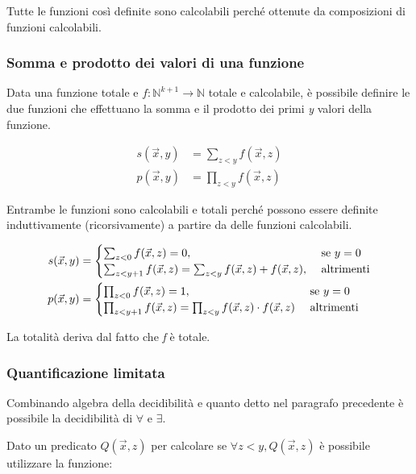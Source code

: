 Tutte le funzioni così definite sono calcolabili perché ottenute da composizioni di funzioni calcolabili.

\subsubsection{Somma e prodotto dei valori di una funzione}

Data una funzione totale e $ f : \mathbb{N}^{k+1} \rightarrow  \mathbb{N}$ totale e calcolabile, è possibile definire le due funzioni che effettuano la somma e il prodotto dei primi \textit{y} valori della funzione.

\begin{align*}
	s(\vec{x}, y) &= \sum_{z < y} f(\vec{x},z) \\
	p(\vec{x}, y) &= \prod_{z < y} f(\vec{x},z) 
\end{align*}

Entrambe le funzioni sono calcolabili e totali perché possono essere definite induttivamente (ricorsivamente) a partire da delle funzioni calcolabili.

\begin{align*}
s(\vec{x}, y) &= \begin{cases} \sum_{z < 0}f(\vec{x},z) = 0, &\text{ se $ y = 0 $} \\
\sum_{z < y+1}f(\vec{x},z) = \sum_{z < y}f(\vec{x},z) + f(\vec{x},z), &\text{ altrimenti}
\end{cases} \\
p(\vec{x}, y) &=  \begin{cases} \prod_{z < 0}f(\vec{x},z) = 1, &\text{ se $ y = 0 $} \\
\prod_{z < y+1}f(\vec{x},z) = \prod_{z < y}f(\vec{x},z) \cdot f(\vec{x},z) &\text{ altrimenti}
\end{cases}
\end{align*}

La totalità deriva dal fatto che \textit{f} è totale.

\subsubsection{Quantificazione limitata}

Combinando algebra della decidibilità e quanto detto nel paragrafo precedente è possibile la decidibilità di $ \forall $ e $ \exists $.

Dato un predicato $ Q(\vec{x},z) $ per calcolare se $ \forall z < y, Q(\vec{x},z) $ è possibile utilizzare la funzione:

